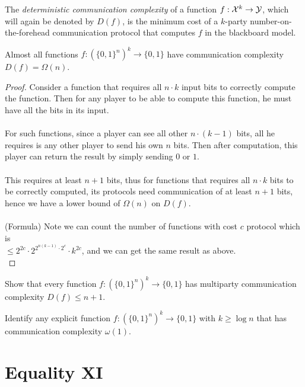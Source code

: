The \emph{deterministic communication complexity} of a function $f : \mathcal{X}^k \to \mathcal{Y}$, which will again be denoted by $D(f)$, is the minimum cost of a $k$-party number-on-the-forehead communication protocol that computes $f$ in the blackboard model.

\begin{theorem}
	Almost all functions $f : (\{0,1\}^{n})^k \to \{0,1\}$ have communication complexity $D(f) = \Omega(n)$.
\end{theorem}

\begin{proof}
	Consider a function that requires all $n\cdot k$ input bits to correctly compute the function. Then for any player to be able to compute this function, he must have all the bits in its input.\\
	\\
	For such functions, since a player can see all other $n\cdot (k-1)$ bits, all he requires is any other player to send his own $n$ bits. Then after computation, this player can return the result by simply sending $0$ or $1$.\\
	\\
	This requires at least $n+1$ bits, thus for functions that requires all $n\cdot k$ bits to be correctly computed, its protocols need communication of at least $n+1$ bits, hence we have a lower bound of $\Omega(n)$ on $D(f)$.\\
	\\
	(Formula) Note  we can count the number of functions with cost $c$ protocol which is\\
	$\leq2^{2c}\cdot 2^{2^{n(k-1)}\cdot 2^c}\cdot k^{2c}$, and we can get the same result as above.\\
\end{proof}

\exercises

\begin{exercise}
	Show that every function $f : (\{0,1\}^{n})^k \to \{0,1\}$ has multiparty communication complexity $D(f) \le n+1$.
\end{exercise}

\begin{open}
	Identify any explicit function $f : (\{0,1\}^{n})^k \to \{0,1\}$ with $k \ge \log n$ that has communication complexity $\omega(1)$.
\end{open}



\section{Equality XI}

